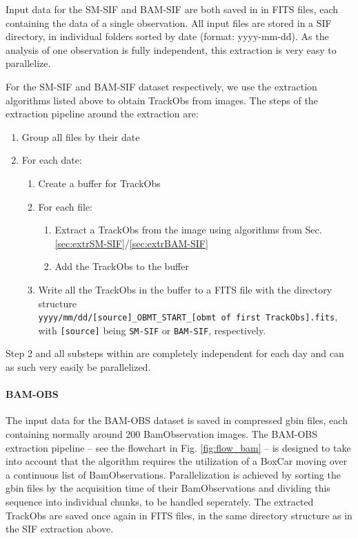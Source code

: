 \documentclass[a4paper, 11pt]{article}
\begin{document}
Input data for the SM-SIF and BAM-SIF are both saved in in FITS files, each containing the data of a single observation. All input files are stored in a SIF directory, in individual folders sorted by date (format: yyyy-mm-dd). As the analysis of one observation is fully independent, this extraction is very easy to parallelize. 

For the SM-SIF and BAM-SIF dataset respectively, we use the extraction algorithms listed above to obtain TrackObs from images. The steps of the extraction pipeline around the extraction are:

\begin{enumerate}
  \item Group all files by their date
  \item For each date:
  \begin{enumerate}
    \item Create a buffer for TrackObs
    \item For each file:
      \begin{enumerate}
        \item Extract a TrackObs from the image using algorithms from Sec. \ref{sec:extrSM-SIF}/\ref{sec:extrBAM-SIF}
        \item Add the TrackObs to the buffer
      \end{enumerate}
    \item Write all the TrackObs in the buffer to a FITS file with the directory structure\\
    \texttt{yyyy/mm/dd/[source]\_OBMT\_START\_[obmt of first TrackObs].fits},\\
    with \texttt{[source]} being \texttt{SM-SIF} or \texttt{BAM-SIF}, respectively.
  \end{enumerate}
\end{enumerate}

Step 2 and all substeps within are completely independent for each day and can as such very easily be parallelized. 


\paragraph{BAM-OBS\\}

The input data for the BAM-OBS dataset is saved in compressed gbin files, each containing normally around 200 BamObservation images. The BAM-OBS extraction pipeline -- see the flowchart in Fig. \ref{fig:flow_bam} -- is designed to take into account that the algorithm requires the utilization of a BoxCar moving over a continuous list of BamObservations. Parallelization is achieved by sorting the gbin files by the acquisition time of their BamObservations and dividing this sequence into individual chunks, to be handled seperately. The extracted TrackObs are saved once again in FITS files, in the same directory structure as in the SIF extraction above.
\end{document}
